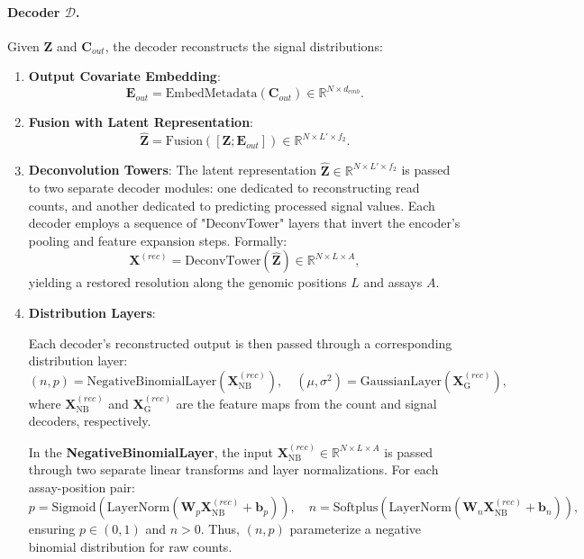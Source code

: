 \documentclass[a4paper, 11pt]{article}
\begin{document}
\paragraph{Decoder $\mathcal{D}$.}
Given $\mathbf{Z}$ and $\mathbf{C}_{out}$, the decoder reconstructs the signal distributions:
\begin{enumerate}
    \item \textbf{Output Covariate Embedding}:
    \[
    \mathbf{E}_{out} = \text{EmbedMetadata}(\mathbf{C}_{out}) \in \mathbb{R}^{N \times d_{emb}}.
    \]

    \item \textbf{Fusion with Latent Representation}:
    \[
    \hat{\mathbf{Z}} = \text{Fusion}([\mathbf{Z}; \mathbf{E}_{out}]) \in \mathbb{R}^{N \times L' \times f_2}.
    \]

    \item \textbf{Deconvolution Towers}:
        The latent representation \(\hat{\mathbf{Z}} \in \mathbb{R}^{N \times L' \times f_2}\) is passed to two separate decoder modules: one dedicated to reconstructing read counts, and another dedicated to predicting processed signal values. Each decoder employs a sequence of "DeconvTower" layers that invert the encoder’s pooling and feature expansion steps. Formally:
        \[
        \mathbf{X}^{(rec)} = \text{DeconvTower}(\hat{\mathbf{Z}}) \in \mathbb{R}^{N \times L \times A},
        \]
        yielding a restored resolution along the genomic positions $L$ and assays $A$.
    
    \item \textbf{Distribution Layers}:

        Each decoder’s reconstructed output is then passed through a corresponding distribution layer:
        \[
        (n,p) = \text{NegativeBinomialLayer}(\mathbf{X}^{(rec)}_{\text{NB}}), \quad (\mu,\sigma^2) = \text{GaussianLayer}(\mathbf{X}^{(rec)}_{\text{G}}),
        \]
        where \(\mathbf{X}^{(rec)}_{\text{NB}}\) and \(\mathbf{X}^{(rec)}_{\text{G}}\) are the feature maps from the count and signal decoders, respectively.
    
        In the \textbf{NegativeBinomialLayer}, the input \(\mathbf{X}^{(rec)}_{\text{NB}} \in \mathbb{R}^{N \times L \times A}\) is passed through two separate linear transforms and layer normalizations. For each assay-position pair:
        \[
        p = \text{Sigmoid}(\text{LayerNorm}(\mathbf{W}_p \mathbf{X}^{(rec)}_{\text{NB}} + \mathbf{b}_p)), \quad n = \text{Softplus}(\text{LayerNorm}(\mathbf{W}_n \mathbf{X}^{(rec)}_{\text{NB}} + \mathbf{b}_n)),
        \]
        ensuring $p \in (0,1)$ and $n>0$. Thus, $(n,p)$ parameterize a negative binomial distribution for raw counts.
    

\end{enumerate}
\end{document}
